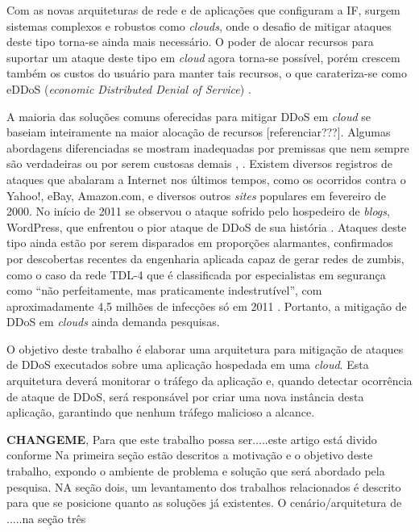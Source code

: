 \documentclass[a4paper, 12pt]{article}
\begin{document}
Com as novas arquiteturas de rede e de aplicações que configuram a IF, surgem sistemas complexos e robustos como \emph{clouds}, onde o desafio de mitigar ataques deste tipo torna-se ainda mais necessário.  O poder de
alocar recursos para suportar um ataque deste tipo em \emph{cloud}  agora torna-se
possível, porém crescem também os custos do usuário para manter tais recursos, o que
carateriza-se como eDDoS (\emph{economic Distributed Denial of Service}) \cite{Soon:10}.
  
A maioria das soluções comuns oferecidas para mitigar DDoS em \emph{cloud} se baseiam inteiramente na maior alocação de
recursos [referenciar???]. 
%
Algumas abordagens diferenciadas se mostram inadequadas por premissas que nem sempre são verdadeiras ou por serem custosas demais \cite{Bakshi:10}, \cite{Liu:2010:NFD:1866835.1866849}.
Existem diversos registros de ataques que abalaram a Internet nos últimos tempos, como os ocorridos contra o Yahoo!, eBay, Amazon.com, e diversos outros \emph{sites} populares em fevereiro de 2000.  No início de 2011 se observou o ataque sofrido pelo hospedeiro de \emph{blogs}, WordPress, que enfrentou o pior ataque de DDoS de sua história \cite{infoexame}. Ataques deste tipo ainda estão por serem disparados em proporções alarmantes, confirmados por descobertas recentes da engenharia aplicada capaz de gerar redes de zumbis, como o caso da rede TDL-4 que é classificada por especialistas em segurança como “não perfeitamente, mas praticamente indestrutível”, com aproximadamente 4,5 milhões de infecções só em 2011 \cite{tdl4}. Portanto, a mitigação de DDoS em \emph{clouds} ainda demanda pesquisas.

O objetivo deste trabalho é elaborar uma arquitetura para mitigação de ataques de
DDoS executados sobre uma aplicação hospedada em uma \emph{cloud}. Esta
arquitetura deverá monitorar o tráfego da aplicação e, quando
detectar ocorrência de ataque de DDoS, será responsável por criar uma nova
instância desta aplicação, garantindo que nenhum tráfego malicioso a alcance. 

\textbf{CHANGEME},
Para que este trabalho possa ser.....este artigo está divido conforme 
Na primeira seção estão descritos a motivação e o objetivo deste trabalho, expondo o ambiente de problema e solução que será abordado pela pesquisa. NA seção dois, um levantamento dos trabalhos relacionados é descrito para que se posicione quanto as soluções já existentes. O cenário/arquitetura de .....na seção três

%
%
\end{document}
